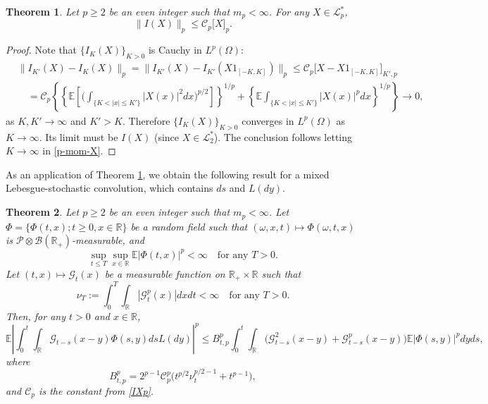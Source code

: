 \documentclass[12pt]{article}
\newtheorem{theorem}{Theorem}[section]
\def\cB{\mathcal{B}}
\def\cC{\mathcal{C}}
\def\cG{\mathcal{G}}
\def\cL{\mathcal{L}}
\def\cP{\mathcal{P}}
\def\bE{\mathbb{E}}
\def\bR{\mathbb{R}}
\begin{document}
\begin{theorem}
\label{p-mom-X1}
Let $p \geq 2$ be an even integer such that $m_p<\infty$. For any $X \in \cL_p^*$,
\begin{equation}
\label{IXp}
\|I(X)\|_p \leq \cC_p \big[ X\big]_{p}.
\end{equation}
\end{theorem}

\begin{proof}
Note that $\{I_K(X)\}_{K>0}$ is Cauchy in $L^p(\Omega)$: 
\begin{align*}
& \|I_{K'}(X)-I_K(X)\|_p =\|I_{K'}(X)-I_{K'}(X1_{[-K,K]})\|_p \leq \cC_p \big[X-X 1_{[-K,K]}\big]_{K',p}
\\
& \quad = \cC_p \left\{ \left\{\bE\left[ \Big(\int_{\{K<|x| \leq K'\}}|X(x)|^2 dx \Big)^{p/2} \right] \right\}^{1/p} + \left\{ \bE \int_{\{K<|x|\leq K'\}}|X(x)|^p dx \right\}^{1/p}\right\} \to 0,
\end{align*}
as $K,K' \to \infty$ and $K'>K$. Therefore $\{I_K(X)\}_{K>0}$ converges in $L^p(\Omega)$ as $K \to \infty$. Its limit must be $I(X)$ (since $X \in \cL_2^*$). The conclusion follows letting $K \to \infty$ in \eqref{p-mom-X}.
\end{proof}

As an application of Theorem \ref{p-mom-X1}, we obtain the following result for a mixed Lebesgue-stochastic convolution, which contains $ds$ and $L(dy)$. 

\begin{theorem}
\label{p-mom-X2}
Let $p\geq 2$ be an even integer such that $m_p<\infty$. Let $\Phi=\{\Phi(t,x);t\geq 0,x\in \bR\}$ be a random field such that $(\omega,x,t) \mapsto \Phi(\omega,t,x)$ is $\cP \otimes \cB(\bR_{+})$-measurable, and
\[
\sup_{t\leq T} \sup_{x\in \bR} \bE|\Phi(t,x)|^p<\infty \quad \mbox{for any $T>0$}.
\]
Let $(t,x)\mapsto \cG_t(x)$ be a measurable function on $\bR_{+} \times \bR$ such that 
\begin{equation}
\label{def-nuT}
\nu_T:=\int_0^T \int_{\bR} |\cG_{t}^p(x)|dxdt<\infty \quad \mbox{for any $T>0$}.
\end{equation}
Then, for any $t>0$ and $x \in \bR$,
\[
\bE \left| \int_0^t \int_{\bR} \cG_{t-s}(x-y) \Phi(s,y) ds L(dy) \right|^p \leq B_{t,p}^p
\int_0^t \int_{\bR} \big(\cG_{t-s}^2(x-y)+\cG_{t-s}^p(x-y)\big) \bE|\Phi(s,y)|^p dyds,
\]
where 
\begin{equation}
\label{def-Btp}
B_{t,p}^p=2^{p-1}\cC_p^p \big(t^{p/2}\nu_t^{p/2-1} + t^{p-1} \big),
\end{equation} 
and $\cC_p$ is the constant from \eqref{IXp}.
\end{theorem}
\end{document}
